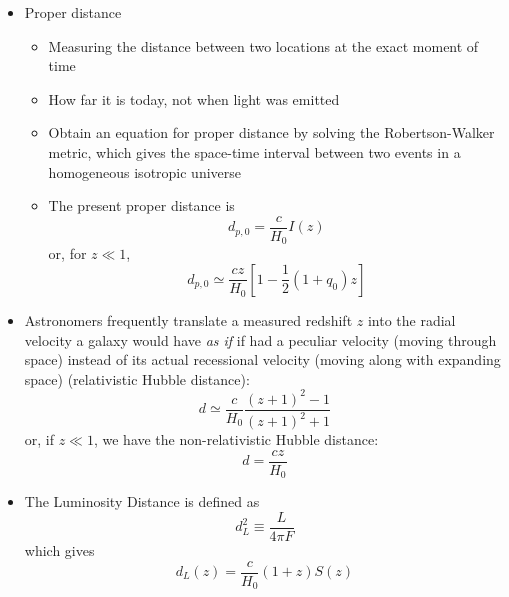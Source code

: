 \documentclass{book}
\begin{document}
\begin{itemize}
    \item Proper distance
          \begin{itemize}
              \item Measuring the distance between two locations at the exact moment of time
              \item How far it is today, not when light was emitted
              \item Obtain an equation for proper distance by solving the Robertson-Walker metric, which gives the space-time interval between two events in a homogeneous isotropic universe
              \item The present proper distance is
                    \begin{equation*}
                        d_{p,0} = \frac{c}{H_0} I(z) \tag{C\&O 29.169}
                    \end{equation*}
                    or, for $z \ll 1$,
                    \begin{equation*}
                        d_{p,0} \simeq \frac{c z}{H_0} \left[ 1 - \frac{1}{2} (1 + q_0) z \right] \tag{C\&O 29.181}
                    \end{equation*}
          \end{itemize}
    \item Astronomers frequently translate a measured redshift $z$ into the radial velocity a galaxy would have \emph{as if} if had a peculiar velocity (moving through space) instead of its actual recessional velocity (moving along with expanding space) (relativistic Hubble distance):
          \begin{equation*}
              d \simeq \frac{c}{H_0} \frac{(z+1)^2 - 1}{(z+1)^2 + 1} \tag{C\&O 27.7}
          \end{equation*}
          or, if $z \ll 1$, we have the non-relativistic Hubble distance:
          \begin{equation*}
              d = \frac{c z}{H_0}
          \end{equation*}
    \item The Luminosity Distance is defined as
          \begin{equation*}
              d_L^2 \equiv \frac{L}{4 \pi F} \tag{C\&O 29.182}
          \end{equation*}
          which gives
          \begin{equation*}
              d_L(z) = \frac{c}{H_0} (1 + z) S(z) \tag{C\&O 29.184}
          \end{equation*}

\end{itemize}
\end{document}
